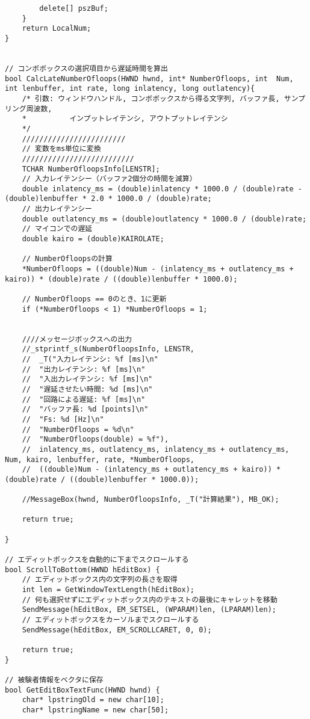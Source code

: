 \begin{verbatim}
		delete[] pszBuf;
	}
	return LocalNum;
}


// コンボボックスの選択項目から遅延時間を算出
bool CalcLateNumberOfloops(HWND hwnd, int* NumberOfloops, int  Num, int lenbuffer, int rate, long inlatency, long outlatency){
	/* 引数: ウィンドウハンドル, コンボボックスから得る文字列, バッファ長, サンプリング周波数, 
	*          インプットレイテンシ, アウトプットレイテンシ
	*/
	////////////////////////
	// 変数をms単位に変換
	//////////////////////////
	TCHAR NumberOfloopsInfo[LENSTR];
	// 入力レイテンシー（バッファ2個分の時間を減算）
	double inlatency_ms = (double)inlatency * 1000.0 / (double)rate - (double)lenbuffer * 2.0 * 1000.0 / (double)rate;
	// 出力レイテンシー
	double outlatency_ms = (double)outlatency * 1000.0 / (double)rate;
	// マイコンでの遅延
	double kairo = (double)KAIROLATE;

	// NumberOfloopsの計算
	*NumberOfloops = ((double)Num - (inlatency_ms + outlatency_ms + kairo)) * (double)rate / ((double)lenbuffer * 1000.0);

	// NumberOfloops == 0のとき、1に更新
	if (*NumberOfloops < 1) *NumberOfloops = 1;


	////メッセージボックスへの出力
	//_stprintf_s(NumberOfloopsInfo, LENSTR,
	//	_T("入力レイテンシ: %f [ms]\n"
	//	"出力レイテンシ: %f [ms]\n"
	//	"入出力レイテンシ: %f [ms]\n"
	//	"遅延させたい時間: %d [ms]\n"
	//	"回路による遅延: %f [ms]\n"
	//	"バッファ長: %d [points]\n"
	//	"Fs: %d [Hz]\n"
	//	"NumberOfloops = %d\n"
	//	"NumberOfloops(double) = %f"),
	//	inlatency_ms, outlatency_ms, inlatency_ms + outlatency_ms, Num, kairo, lenbuffer, rate, *NumberOfloops,
	//	((double)Num - (inlatency_ms + outlatency_ms + kairo)) * (double)rate / ((double)lenbuffer * 1000.0));

	//MessageBox(hwnd, NumberOfloopsInfo, _T("計算結果"), MB_OK);

	return true;

}

// エディットボックスを自動的に下までスクロールする
bool ScrollToBottom(HWND hEditBox) {
	// エディットボックス内の文字列の長さを取得
	int len = GetWindowTextLength(hEditBox);
	// 何も選択せずにエディットボックス内のテキストの最後にキャレットを移動
	SendMessage(hEditBox, EM_SETSEL, (WPARAM)len, (LPARAM)len);
	// エディットボックスをカーソルまでスクロールする
	SendMessage(hEditBox, EM_SCROLLCARET, 0, 0);

	return true;
}

// 被験者情報をベクタに保存
bool GetEditBoxTextFunc(HWND hwnd) {
	char* lpstringOld = new char[10];
	char* lpstringName = new char[50];


\end{verbatim}
